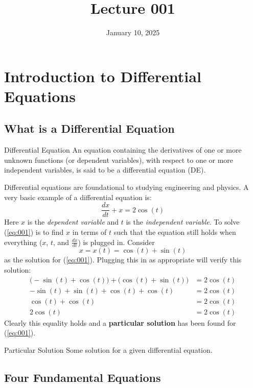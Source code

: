 \documentclass[12pt]{article}
\title{Lecture 001}
\date{January 10, 2025}
\begin{document}
\section{Introduction to Differential Equations}
\label{sec:introductionToDifferentialEquations}

\subsection{What is a Differential Equation}
\label{ssec:whatIsADifferentialEquation}

\begin{definition}{Differential Equation}
  An equation containing the derivatives of one or more unknown functions (or dependent variables), with respect to one or more independent variables, is said to be a differential equation (DE).
\end{definition}

Differential equations are foundational to studying engineering and physics. A very basic example of a differential equation is:
\begin{equation}
  \frac{dx}{dt} + x = 2 \cos(t)
  \label{eq:001}
\end{equation}
Here $x$ is the \textit{dependent variable} and $t$ is the \textit{independent variable}. To solve (\ref{eq:001}) is to find $x$ in terms of $t$ such that the equation still holds when everything ($x$, $t$, and $\frac{dx}{dt}$) is plugged in. Consider 
\begin{equation*}
  x=x(t)=\cos (t) + \sin (t)
\end{equation*}
as the solution for (\ref{eq:001}). Plugging this in as appropriate will verify this solution:
\begin{align*}
  \big(-\sin(t)+\cos(t)\big) + \big(\cos(t)+\sin(t)\big) &= 2\cos(t) \\
  -\sin(t) + \sin(t) + \cos(t) + \cos(t) &= 2\cos(t) \\
  \cos(t) + \cos(t) &= 2\cos(t) \\
  2\cos(t) &= 2\cos(t)
\end{align*}
Clearly this equality holds and a \textbf{particular solution} has been found for (\ref{eq:001}).

\begin{definition}{Particular Solution}
  Some solution for a given differential equation.
\end{definition}

\subsection{Four Fundamental Equations}
\label{ssec:fourFundamentalEquations}
\end{document}
